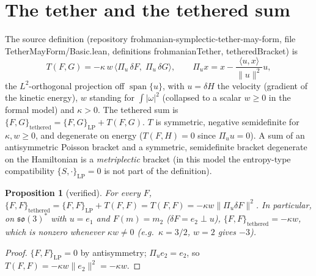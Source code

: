 \documentclass[11pt]{article}
\newtheorem{proposition}{Proposition}\theoremstyle{remark}\newtheorem{remark}{Remark}
\renewcommand{\texttt}[1]{{\ttfamily\hyphenchar\font=45\relax\textup{#1}}}
\begin{document}
\section{The tether and the tethered sum}
The source definition (repository \texttt{frohmanian-symplectic-tether-may-form}, file \texttt{TetherMayForm/Basic.lean}, definitions \texttt{frohmanianTether}, \texttt{tetheredBracket}) is
\[
T(F,G)=-\kappa\,w\,\langle\Pi_u\,\delta F,\;\Pi_u\,\delta G\rangle,\qquad
\Pi_u x=x-\frac{\langle u,x\rangle}{\|u\|^2}u,
\]
the $L^2$-orthogonal projection off $\operatorname{span}\{u\}$, with $u=\delta H$ the velocity (gradient of the kinetic energy), $w$ standing for $\int|\omega|^2$ (collapsed to a scalar $w\ge 0$ in the formal model) and $\kappa>0$. The tethered sum is
$\{F,G\}_{\mathrm{tethered}}=\{F,G\}_{\mathrm{LP}}+T(F,G)$.
$T$ is symmetric, negative semidefinite for $\kappa,w\ge0$, and degenerate on energy ($T(F,H)=0$ since $\Pi_u u=0$). A sum of an antisymmetric Poisson bracket and a symmetric, semidefinite bracket degenerate on the Hamiltonian is a \emph{metriplectic} bracket (in this model the entropy-type compatibility $\{S,\cdot\}_{\mathrm{LP}}=0$ is not part of the definition).

\begin{proposition}[verified]
For every $F$, $\{F,F\}_{\mathrm{tethered}}=\{F,F\}_{\mathrm{LP}}+T(F,F)=T(F,F)=-\kappa w\|\Pi_u\delta F\|^2$.
In particular, on $\mathfrak{so}(3)^*$ with $u=e_1$ and $F(m)=m_2$ ($\delta F=e_2\perp u$),
$\{F,F\}_{\mathrm{tethered}}=-\kappa w$, which is nonzero whenever $\kappa w\neq0$ (e.g.\ $\kappa=3/2$, $w=2$ gives $-3$).
\end{proposition}
\begin{proof}
$\{F,F\}_{\mathrm{LP}}=0$ by antisymmetry; $\Pi_u e_2=e_2$, so $T(F,F)=-\kappa w\|e_2\|^2=-\kappa w$.
\end{proof}
\end{document}
